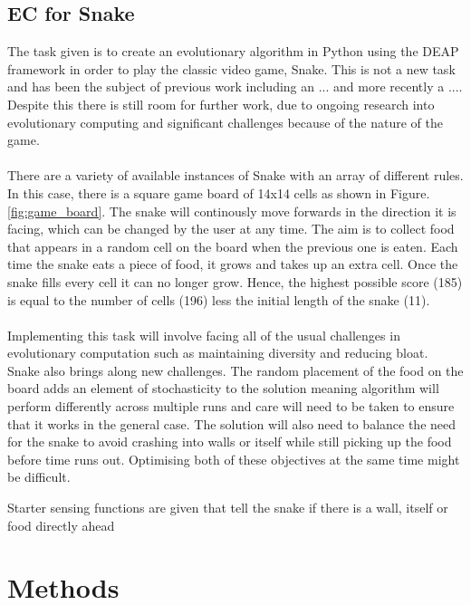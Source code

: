 \documentclass{article}
\begin{document}
\subsection{EC for Snake}
The task given is to create an evolutionary algorithm in Python using the DEAP framework in order to play the classic video game, Snake. This is not a new task and has been the subject of previous work including an ...\cite{snake_blog} and more recently a ...\cite{snake_paper}. Despite this there is still room for further work, due to ongoing research into evolutionary computing and significant challenges because of the nature of the game.
\\\\
There are a variety of available instances of Snake with an array of different rules. In this case, there is a square game board of 14x14 cells as shown in Figure. \ref{fig:game_board}. The snake will continously move forwards in the direction it is facing, which can be changed by the user at any time. The aim is to collect food that appears in a random cell on the board when the previous one is eaten. Each time the snake eats a piece of food, it grows and takes up an extra cell. Once the snake fills every cell it can no longer grow. Hence, the highest possible score (185) is equal to the number of cells (196) less the initial length of the snake (11).
\\\\
Implementing this task will involve facing all of the usual challenges in evolutionary computation such as maintaining diversity and reducing bloat. Snake also brings along new challenges. The random placement of the food on the board adds an element of stochasticity to the solution meaning algorithm will perform differently across multiple runs and care will need to be taken to ensure that it works in the general case. The solution will also need to balance the need for the snake to avoid crashing into walls or itself while still picking up the food before time runs out. Optimising both of these objectives at the same time might be difficult.

Starter sensing functions are given that tell the snake if there is a wall, itself or food directly ahead

\section{Methods} %
\end{document}
